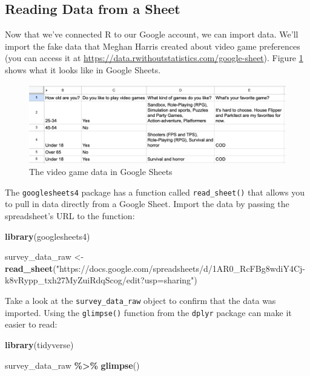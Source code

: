 \documentclass[
]{book}
\newenvironment{Shaded}{\begin{snugshade}}{\end{snugshade}}
\newcommand{\FunctionTok}[1]{\textcolor[rgb]{0.13,0.29,0.53}{\textbf{#1}}}
\newcommand{\NormalTok}[1]{#1}
\newcommand{\OtherTok}[1]{\textcolor[rgb]{0.56,0.35,0.01}{#1}}
\newcommand{\SpecialCharTok}[1]{\textcolor[rgb]{0.81,0.36,0.00}{\textbf{#1}}}
\newcommand{\StringTok}[1]{\textcolor[rgb]{0.31,0.60,0.02}{#1}}
\begin{document}
\hypertarget{reading-data-from-a-sheet}{%
\subsection*{Reading Data from a Sheet}\label{reading-data-from-a-sheet}}

Now that we've connected R to our Google account, we can import data. We'll import the fake data that Meghan Harris created about video game preferences (you can access it at \url{https://data.rwithoutstatistics.com/google-sheet}). Figure \ref{fig:video-game-survey-data} shows what it looks like in Google Sheets.

\begin{figure}
\includegraphics[width=1\linewidth]{assets/video-game-survey-data} \caption{The video game data in Google Sheets}\label{fig:video-game-survey-data}
\end{figure}

The \texttt{googlesheets4} package has a function called \texttt{read\_sheet()} that allows you to pull in data directly from a Google Sheet. Import the data by passing the spreadsheet's URL to the function:

\begin{Shaded}
\begin{Highlighting}[]
\FunctionTok{library}\NormalTok{(googlesheets4)}

\NormalTok{survey\_data\_raw }\OtherTok{\textless{}{-}} \FunctionTok{read\_sheet}\NormalTok{(}\StringTok{"https://docs.google.com/spreadsheets/d/1AR0\_RcFBg8wdiY4Cj{-}k8vRypp\_txh27MyZuiRdqScog/edit?usp=sharing"}\NormalTok{)}
\end{Highlighting}
\end{Shaded}

Take a look at the \texttt{survey\_data\_raw} object to confirm that the data was imported. Using the \texttt{glimpse()} function from the \texttt{dplyr} package can make it easier to read:

\begin{Shaded}
\begin{Highlighting}[]
\FunctionTok{library}\NormalTok{(tidyverse)}

\NormalTok{survey\_data\_raw }\SpecialCharTok{\%\textgreater{}\%}
  \FunctionTok{glimpse}\NormalTok{()}
\end{Highlighting}
\end{Shaded}
\end{document}
